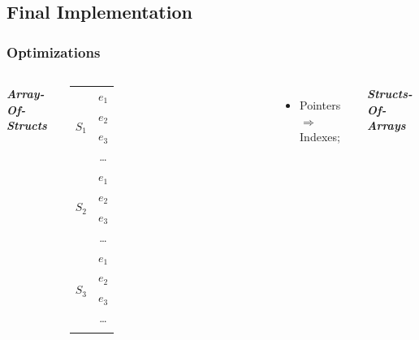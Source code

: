 \documentclass{beamer}
\begin{document}
\subsection{Final Implementation}

\begin{frame}
	\frametitle{Optimizations}
	\begin{columns}
		\smaller
			\centering
			\textbf{\itshape Array-Of-Structs}

			\smaller
			\begin{tabular}{|c|c|}
				\hline
				\multirow{4}{*}{$S_{1}$} & $e_{1}$\\
				\cline{2-2}
				& $e_{2}$\\
				\cline{2-2}
				& $e_{3}$\\
				\cline{2-2}
				& \ldots\\
				\hline
				\multirow{4}{*}{$S_{2}$} & $e_{1}$\\
				\cline{2-2}
				& $e_{2}$\\
				\cline{2-2}
				& $e_{3}$\\
				\cline{2-2}
				& \ldots\\

				\hline
				\multirow{5}{*}{$S_{3}$} & $e_{1}$\\
				\cline{2-2}
				& $e_{2}$\\
				\cline{2-2}
				& $e_{3}$\\
				\cline{2-2}
				& \dots\\
				\hline
				\multicolumn{2}{|c|}{\ldots}
			\end{tabular}
			\larger

			\begin{itemize}
				\item Pointers $\Rightarrow$ Indexes;
			\end{itemize}

			
			\centering
			\textbf{\itshape Structs-Of-Arrays}


\end{columns}
\end{frame}
\end{document}

